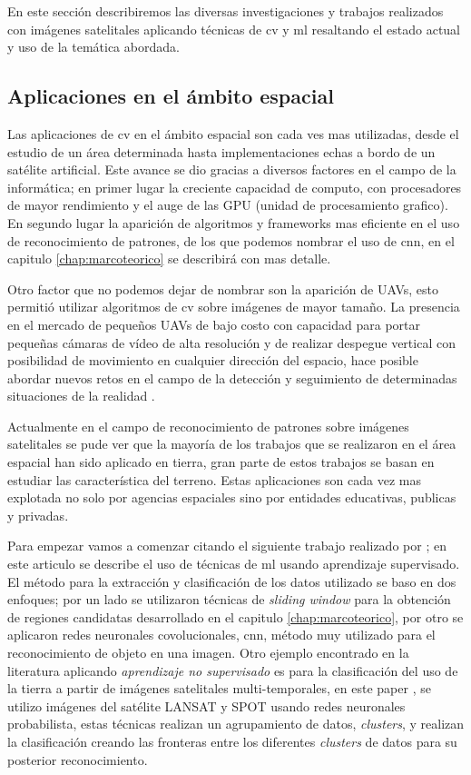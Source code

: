 En este sección describiremos las diversas investigaciones y trabajos realizados con imágenes satelitales aplicando técnicas de \ac{cv} y \ac{ml} resaltando el estado actual y uso de la temática abordada.

\subsection{Aplicaciones en el ámbito espacial}\label{sub:estadodelacuestion}

Las aplicaciones de \ac{cv} en el ámbito espacial son cada ves mas utilizadas, desde el estudio de un área determinada hasta implementaciones echas a bordo de un satélite artificial. Este avance se dio gracias a diversos factores en el campo de la informática; en primer lugar la creciente capacidad de computo, con procesadores de mayor rendimiento y el auge de las GPU (unidad de procesamiento grafico). En segundo lugar la aparición de algoritmos y frameworks mas eficiente en el uso de reconocimiento de patrones, de los que podemos nombrar el uso de \ac{cnn}, en el capitulo \ref{chap:marcoteorico} se describirá con mas detalle. 

Otro factor que no podemos dejar de nombrar son la aparición de UAVs, esto permitió utilizar algoritmos de \ac{cv} sobre imágenes de mayor tamaño. La presencia en el mercado de pequeños UAVs de bajo costo con capacidad para portar pequeñas cámaras de vídeo de alta resolución y de realizar despegue vertical con posibilidad de movimiento en cualquier dirección del espacio, hace posible abordar nuevos retos en el campo de la detección y seguimiento de determinadas situaciones de la realidad \citep{Lanillos}.

Actualmente en el campo de reconocimiento de patrones sobre imágenes satelitales se pude ver que la mayoría de los trabajos que se realizaron en el área espacial han sido aplicado en tierra, gran parte de estos trabajos se basan en estudiar las característica del terreno. Estas aplicaciones son cada vez mas explotada no solo por agencias espaciales sino por entidades educativas, publicas y privadas. 

Para empezar vamos a comenzar citando el siguiente trabajo realizado por \citep{Cheang}; en este articulo se describe el uso de técnicas de \ac{ml} usando aprendizaje supervisado. El método para la extracción y clasificación de los datos utilizado se baso en dos enfoques; por un lado se utilizaron técnicas de \textit{sliding window} para la obtención de regiones candidatas desarrollado en el capitulo \ref{chap:marcoteorico}, por otro se aplicaron redes neuronales covolucionales, \ac{cnn}, método muy utilizado para el reconocimiento de objeto en una imagen. Otro ejemplo encontrado en la literatura aplicando  \textit{aprendizaje no supervisado} es para la clasificación del uso de la tierra a partir de imágenes satelitales multi-temporales, en este paper \citep{pnn}, se utilizo imágenes del satélite LANSAT y SPOT usando redes neuronales probabilista, estas técnicas realizan un agrupamiento de datos, \textit{clusters}, y realizan la clasificación creando las fronteras entre los diferentes \textit{clusters} de datos para su posterior reconocimiento.

